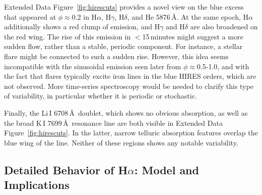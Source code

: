 \documentclass{nature3}
\begin{document}
\begin{methods}
Extended Data Figure~\ref{fig:hirescuts} provides a novel view on the
blue excess that appeared at $\phi$$\approx$0.2 in H$\alpha$,
H$\gamma$, H$\delta$, and He 5876\,\AA.  At the same epoch, H$\alpha$
additionally shows a red clump of emission, and H$\gamma$ and
H$\delta$ are also broadened on the red wing.  The rise of this
emission in $<$15\,minutes might suggest a more sudden flow, rather
than a stable, periodic component.  For instance, a stellar flare
might be connected to such a sudden rise.  However, this idea seems
incompatible with the sinusoidal emission seen later from
$\phi$$\approx$0.5-1.0, and with the fact that flares typically excite
iron lines in the blue HIRES orders, which are not observed.  More
time-series spectroscopy would be needed to clarify this type of
variability, in particular whether it is periodic or stochastic.

Finally, the Li\,\textsc{I} 6708\,\AA\ doublet, which shows no obvious
absorption, as well as the broad K\,\textsc{I} 7699\,\AA\ resonance
line are both visible in Extended Data Figure~\ref{fig:hirescuts}.  In
the latter, narrow telluric absorption features overlap the blue wing
of the line.  Neither of these regions shows any notable variability.



\subsection{Detailed Behavior of H$\alpha$: Model and Implications}\phantom{+}
\label{subsec:halpha}


\end{methods}
\end{document}
